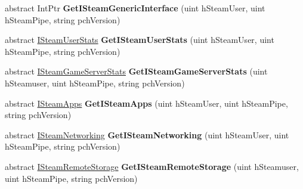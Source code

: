 \begin{DoxyCompactItemize}
\item 
\hypertarget{classValve_1_1Steamworks_1_1ISteamClient_aca16fa10d00fbe3e9a73faa221e9bc82}{}abstract Int\+Ptr {\bfseries Get\+I\+Steam\+Generic\+Interface} (uint h\+Steam\+User, uint h\+Steam\+Pipe, string pch\+Version)\label{classValve_1_1Steamworks_1_1ISteamClient_aca16fa10d00fbe3e9a73faa221e9bc82}

\item 
\hypertarget{classValve_1_1Steamworks_1_1ISteamClient_a76f255df0ff9f7796317045bb3ad973a}{}abstract \hyperlink{classValve_1_1Steamworks_1_1ISteamUserStats}{I\+Steam\+User\+Stats} {\bfseries Get\+I\+Steam\+User\+Stats} (uint h\+Steam\+User, uint h\+Steam\+Pipe, string pch\+Version)\label{classValve_1_1Steamworks_1_1ISteamClient_a76f255df0ff9f7796317045bb3ad973a}

\item 
\hypertarget{classValve_1_1Steamworks_1_1ISteamClient_a5052facd9e3effddd383e468f7413381}{}abstract \hyperlink{classValve_1_1Steamworks_1_1ISteamGameServerStats}{I\+Steam\+Game\+Server\+Stats} {\bfseries Get\+I\+Steam\+Game\+Server\+Stats} (uint h\+Steamuser, uint h\+Steam\+Pipe, string pch\+Version)\label{classValve_1_1Steamworks_1_1ISteamClient_a5052facd9e3effddd383e468f7413381}

\item 
\hypertarget{classValve_1_1Steamworks_1_1ISteamClient_ad95bd01bd0c9c831638f225981e8cc2b}{}abstract \hyperlink{classValve_1_1Steamworks_1_1ISteamApps}{I\+Steam\+Apps} {\bfseries Get\+I\+Steam\+Apps} (uint h\+Steam\+User, uint h\+Steam\+Pipe, string pch\+Version)\label{classValve_1_1Steamworks_1_1ISteamClient_ad95bd01bd0c9c831638f225981e8cc2b}

\item 
\hypertarget{classValve_1_1Steamworks_1_1ISteamClient_aa6e3627d0eb28df7c009000ba6901f76}{}abstract \hyperlink{classValve_1_1Steamworks_1_1ISteamNetworking}{I\+Steam\+Networking} {\bfseries Get\+I\+Steam\+Networking} (uint h\+Steam\+User, uint h\+Steam\+Pipe, string pch\+Version)\label{classValve_1_1Steamworks_1_1ISteamClient_aa6e3627d0eb28df7c009000ba6901f76}

\item 
\hypertarget{classValve_1_1Steamworks_1_1ISteamClient_aa4f61cb9c372f7730d224be2687cc034}{}abstract \hyperlink{classValve_1_1Steamworks_1_1ISteamRemoteStorage}{I\+Steam\+Remote\+Storage} {\bfseries Get\+I\+Steam\+Remote\+Storage} (uint h\+Steamuser, uint h\+Steam\+Pipe, string pch\+Version)\label{classValve_1_1Steamworks_1_1ISteamClient_aa4f61cb9c372f7730d224be2687cc034}


\end{DoxyCompactItemize}
